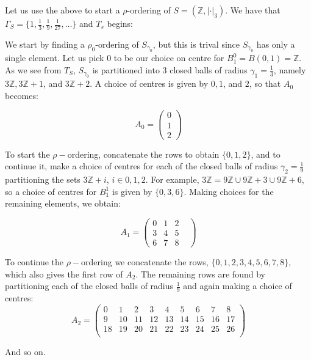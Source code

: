 \begin{example}
Let us use the above to start a $\rho$-ordering of $S=(\mathbb{Z}, \lvert \cdot \rvert_3)$. We have that $\Gamma_S=\{1, \frac{1}{3},\frac{1}{9},\frac{1}{27},\ldots \}$ and $T_s$ begins:

\begin{center}
\end{center}




We start by finding a $\rho_0$-ordering of $S_{\gamma_0}$, but this is trival since $S_{\gamma_0}$ has only a single element. Let us pick $0$ to be our choice on centre for $B^0_1=B(0,1)=\mathbb{Z}$. As we see from $T_S$, $S_{\gamma_0}$ is partitioned into $3$ closed balls of radius $\gamma_1=\frac{1}{3}$, namely $3\mathbb{Z}, 3\mathbb{Z}+1$, and $3\mathbb{Z}+2$. A choice of centres is given by $0,1$, and $2$, so that $A_0$ becomes:

\[A_0=
 \begin{pmatrix}
0 \\
1  \\
2 
\end{pmatrix}
\]


To start the $\rho-$ordering, concatenate the rows to obtain $\{0,1,2\}$, and to continue it, make a choice of centres for each of the closed balls of radius $\gamma_2=\frac{1}{9}$ partitioning the sets $3\mathbb{Z}+i$, $i \in 0,1,2$. For example, $3\mathbb{Z} =  9\mathbb{Z} \cup 9\mathbb{Z}+3 \cup 9\mathbb{Z}+6$, so a choice of centres for $B^1_1$ is given by $\{0,3,6\}$. Making choices for the remaining elements, we obtain: 

\[A_1=
 \begin{pmatrix}
0 & 1 &  2 & \\
3 & 4 &  5 & \\
6 & 7 &  8 &
\end{pmatrix}
\]

To continue the $\rho-$ordering we concatenate the rows, $\{0,1,2,3,4,5,6,7,8\}$, which also gives the first row of $A_2$. The remaining rows are found by partitioning each of the closed balls of radius $\frac{1}{9}$ and again making a choice of centres:
\[A_2=
 \begin{pmatrix}
0 & 1 &  2 & 3 & 4 & 5 & 6 & 7 & 8 \\
9 & 10 &  11 & 12 & 13 & 14 & 15 & 16 & 17 \\
18 & 19 &  20 & 21 & 22 & 23 & 24 & 25 & 26 \\
\end{pmatrix}
\]

And so on. 
\end{example}

